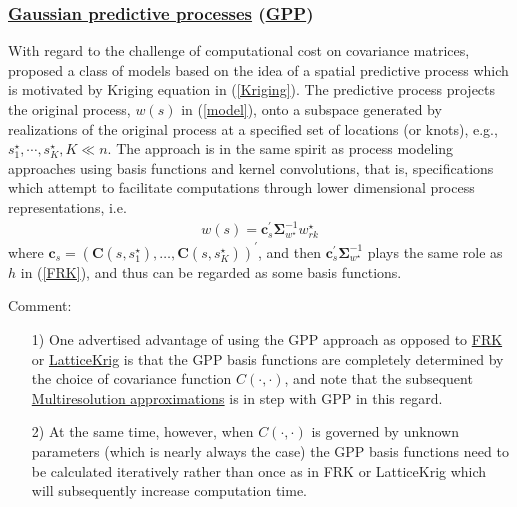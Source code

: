 \documentclass[
12pt, %
a4paper, %
oneside, %
headinclude,footinclude, %
BCOR5mm, %
]{scrartcl}
\begin{document}
\subsubsection{\href{https://chenyw68.github.io/Literature/[2015]spBayes for Large Spatio-Temporal Data Models.pdf}{Gaussian predictive processes} (\href{https://chenyw68.github.io/Literature/[2020]Bayesian spatially varying coefficient models in the spBayes R package.pdf}{GPP})}
With regard to the challenge of computational cost on covariance matrices, \href{https://chenyw68.github.io/Literature/[2008]Gaussian predictive process models for large spatial data sets.pdf}{\citet{banerjee2008gaussian}} proposed a class of models based on the idea of a spatial predictive process which is motivated by Kriging equation in (\ref{Kriging}). The predictive process projects the original process, $w(s)$ in (\ref{model}), onto a subspace generated by realizations of the original process at a specified set of locations (or knots), e.g.,  $s_1^{\star}, \cdots, s_K^{\star}, K \ll n$. The approach is in the same spirit as process modeling approaches using basis functions and kernel convolutions, that is, specifications which attempt to facilitate computations through lower dimensional process representations, i.e.
\begin{equation}
\begin{aligned}
w(s) = \boldsymbol{c}_{s}^\prime\boldsymbol{\Sigma}_{w^{\star}}^{-1}w_{rk}^{\star}
\end{aligned} \label{GPP}
\end{equation}
where $\boldsymbol{c}_{s} = \left(\boldsymbol{C}(s, s_1^{\star}), \dots, \boldsymbol{C}(s, s_K^{\star})\right)^\prime$, and then $\boldsymbol{c}_{s}^\prime\boldsymbol{\Sigma}_{w^{\star}}^{-1}$ plays the same role as $h$ in (\ref{FRK}), and thus can be regarded as some basis functions.

\textcolor[rgb]{1.00,0.00,1.00}{Comment:}
\begin{itemize}
 \item [1)]One advertised advantage of using the GPP approach as opposed to \href{https://chenyw68.github.io/Literature/[2017]FRK_intro.pdf}{FRK} or \href{https://chenyw68.github.io/Literature/[2014]LatticeKrig A multi-resolution spatial model for large data.pdf}{LatticeKrig} is that the GPP basis functions are completely determined by the choice of covariance function $C(\cdot, \cdot)$, and note that the subsequent \href{https://chenyw68.github.io/Literature/[2017]A Multi-Resolution Approximation for Massive Spatial Datasets.pdf}{Multiresolution approximations} is in step with GPP in this regard.
\item [2)]At the same time, however, when $C(\cdot, \cdot)$ is governed by unknown parameters (which is nearly always the case) the GPP basis functions need to be calculated iteratively rather than once as in FRK or LatticeKrig which will subsequently increase computation time.
\end{itemize}
\end{document}
